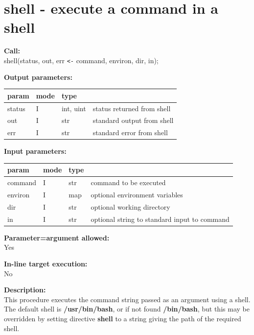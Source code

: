     \section{shell - execute a command in a shell}\label{sec:ipshell}
        
        {\bf Call:} \\
        shell(status, out, err \verb'<-' command, environ, dir, in);
        
        {\bf Output parameters:} \\
        \begin{tabular}{| l | l | l | l |}
        \hline
        param  & mode     & type  & \\
        \hline \hline
        status & I & int, uint & status returned from shell     \\ \hline
        out    & I & str       & standard output from shell     \\ \hline
        err    & I & str       & standard error from shell     \\ \hline
        \end{tabular}
        
        {\bf Input parameters:} \\
        \begin{tabular}{| l | l | l | l |}
        \hline
        param  & mode     & type  & \\
        \hline \hline
        command & I & str & command to be executed          \\ \hline
        environ & I & map & optional environment variables  \\ \hline
        dir     & I & str & optional working directory      \\ \hline
        in      & I & str & optional string to standard input to command \\ \hline
        \end{tabular}
        
        {\bf Parameter=argument allowed:} \\
        Yes
        
        {\bf In-line target execution:} \\
        No
        
        {\bf Description:} \\
        This procedure executes the command string passed as an argument using a
        shell. The default shell is {\bf /usr/bin/bash}, or if not found {\bf
        /bin/bash}, but this may be overridden by setting directive {\bf shell}
        to a string giving the path of the required shell.
        
